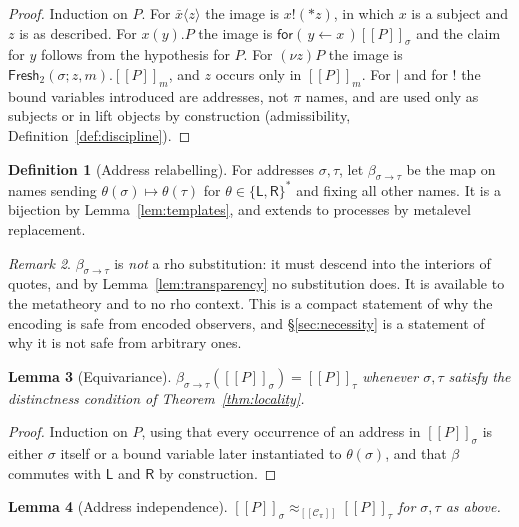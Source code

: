 \documentclass[11pt]{article}
\theoremstyle{definition}
\newtheorem{definition}{Definition}[section]
\theoremstyle{plain}
\newtheorem{lemma}[definition]{Lemma}
\theoremstyle{remark}
\newtheorem{remark}[definition]{Remark}
\newcommand{\drp}[1]{{*}#1}
\newcommand{\inp}[3]{\mathsf{for}(\,#1 \leftarrow #2\,)#3}
\newcommand{\out}[2]{#1!(#2)}
\newcommand{\enc}[1]{[\![#1]\!]}
\newcommand{\Lft}{\mathsf{L}}
\newcommand{\Rgt}{\mathsf{R}}
\newcommand{\Frsh}{\mathsf{Fresh}_2}
\newcommand{\Ctx}{\mathscr{C}}
\newcommand{\bisim}{\approx}
\begin{document}
\begin{proof}
Induction on $P$. For $\bar x\langle z\rangle$ the image is
$\out{x}{\drp{z}}$, in which $x$ is a subject and $z$ is as described.
For $x(y).P$ the image is $\inp{y}{x}{\enc{P}_\sigma}$ and the claim for
$y$ follows from the hypothesis for $P$. For $(\nu z)P$ the image is
$\Frsh(\sigma; z, m).\enc{P}_m$, and $z$ occurs only in
$\enc{P}_m$. For $\mid$ and for $!$ the bound variables introduced are
addresses, not $\pi$ names, and are used only as subjects or in lift
objects by construction (admissibility, Definition~\ref{def:discipline}).
\end{proof}

\begin{definition}[Address relabelling]
For addresses $\sigma,\tau$, let $\beta_{\sigma\to\tau}$ be the map on
names sending $\theta(\sigma) \mapsto \theta(\tau)$ for
$\theta \in \{\Lft,\Rgt\}^*$ and fixing all other names. It is a
bijection by Lemma~\ref{lem:templates}, and extends to processes by
metalevel replacement.
\end{definition}

\begin{remark}
$\beta_{\sigma\to\tau}$ is \emph{not} a rho substitution: it must descend
into the interiors of quotes, and by Lemma~\ref{lem:transparency} no
substitution does. It is available to the metatheory and to no rho
context. This is a compact statement of why the encoding is safe from
encoded observers, and \S\ref{sec:necessity} is a statement of why it is
not safe from arbitrary ones.
\end{remark}

\begin{lemma}[Equivariance]\label{lem:equivariance}
$\beta_{\sigma\to\tau}(\enc{P}_\sigma) = \enc{P}_\tau$ whenever $\sigma,
\tau$ satisfy the distinctness condition of
Theorem~\ref{thm:locality}.
\end{lemma}

\begin{proof}
Induction on $P$, using that every occurrence of an address in
$\enc{P}_\sigma$ is either $\sigma$ itself or a bound variable later
instantiated to $\theta(\sigma)$, and that
$\beta$ commutes with $\Lft$ and $\Rgt$ by construction.
\end{proof}

\begin{lemma}[Address independence]\label{lem:addrind}
$\enc{P}_\sigma \bisim_{\enc{\Ctx_\pi}} \enc{P}_\tau$ for
$\sigma,\tau$ as above.
\end{lemma}
\end{document}
